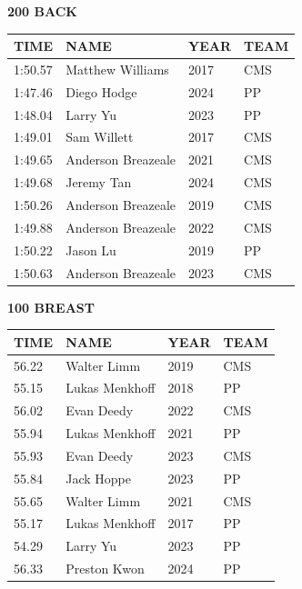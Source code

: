 \begin{table}[H]
\centering
\begin{minipage}[t]{0.48\textwidth}
\centering
\textbf{200 BACK}\\[0.1cm]
\begin{tabular}{@{}p{1.8cm}p{2.8cm}p{1.2cm}p{1.4cm}@{}}
\hline
    \textbf{TIME} & \textbf{NAME} & \textbf{YEAR} & \textbf{TEAM} \\
\hline
    1:50.57 & Matthew Williams & 2017 & CMS \\
    1:47.46 & Diego Hodge & 2024 & PP \\
    1:48.04 & Larry Yu & 2023 & PP \\
    1:49.01 & Sam Willett & 2017 & CMS \\
    1:49.65 & Anderson Breazeale & 2021 & CMS \\
    1:49.68 & Jeremy Tan & 2024 & CMS \\
    1:50.26 & Anderson Breazeale & 2019 & CMS \\
    1:49.88 & Anderson Breazeale & 2022 & CMS \\
    1:50.22 & Jason Lu & 2019 & PP \\
    1:50.63 & Anderson Breazeale & 2023 & CMS \\
\hline
\end{tabular}
\end{minipage}\hfill
\begin{minipage}[t]{0.48\textwidth}
\centering
\textbf{100 BREAST}\\[0.1cm]
\begin{tabular}{@{}p{1.8cm}p{2.8cm}p{1.2cm}p{1.4cm}@{}}
\hline
    \textbf{TIME} & \textbf{NAME} & \textbf{YEAR} & \textbf{TEAM} \\
\hline
    56.22 & Walter Limm & 2019 & CMS \\
    55.15 & Lukas Menkhoff & 2018 & PP \\
    56.02 & Evan Deedy & 2022 & CMS \\
    55.94 & Lukas Menkhoff & 2021 & PP \\
    55.93 & Evan Deedy & 2023 & CMS \\
    55.84 & Jack Hoppe & 2023 & PP \\
    55.65 & Walter Limm & 2021 & CMS \\
    55.17 & Lukas Menkhoff & 2017 & PP \\
    54.29 & Larry Yu & 2023 & PP \\
    56.33 & Preston Kwon & 2024 & PP \\
\hline
\end{tabular}
\end{minipage}
\end{table}

